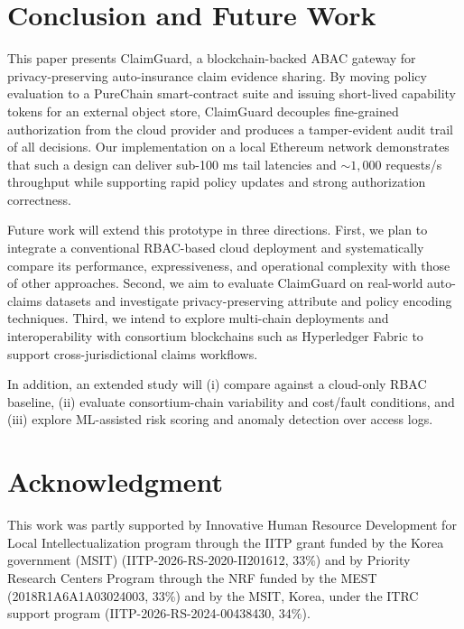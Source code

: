 \documentclass[conference]{IEEEtran}
\begin{document}
\section{Conclusion and Future Work}

This paper presents ClaimGuard, a blockchain-backed ABAC gateway for privacy-preserving auto-insurance claim evidence sharing. By moving policy evaluation to a PureChain smart-contract suite and issuing short-lived capability tokens for an external object store, ClaimGuard decouples fine-grained authorization from the cloud provider and produces a tamper-evident audit trail of all decisions. Our implementation on a local Ethereum network demonstrates that such a design can deliver sub-100 ms tail latencies and ${\sim}1{,}000$ requests/s throughput while supporting rapid policy updates and strong authorization correctness.

Future work will extend this prototype in three directions. First, we plan to integrate a conventional RBAC-based cloud deployment and systematically compare its performance, expressiveness, and operational complexity with those of other approaches. Second, we aim to evaluate ClaimGuard on real-world auto-claims datasets and investigate privacy-preserving attribute and policy encoding techniques. Third, we intend to explore multi-chain deployments and interoperability with consortium blockchains such as Hyperledger Fabric to support cross-jurisdictional claims workflows.

In addition, an extended study will (i) compare against a cloud-only RBAC baseline, (ii) evaluate consortium-chain variability and cost/fault conditions, and (iii) explore ML-assisted risk scoring and anomaly detection over access logs.

\section*{Acknowledgment}
This work was partly supported by Innovative Human Resource Development for Local Intellectualization program through the IITP grant funded by the Korea government (MSIT) (IITP-2026-RS-2020-II201612, 33\%) and by Priority Research Centers Program through the NRF funded by the MEST (2018R1A6A1A03024003, 33\%) and by the MSIT, Korea, under the ITRC support program (IITP-2026-RS-2024-00438430, 34\%).

\balance


\end{document}
